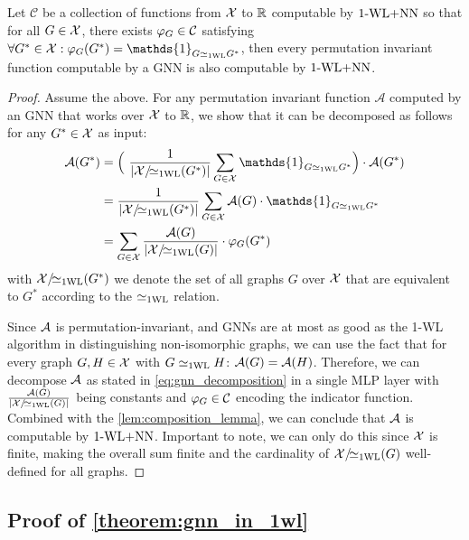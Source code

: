 \begin{lemma}\label{lem:decompose_gnn_as_wl}
    Let $\mathcal{C}$ be a collection of functions from $\mathcal{X}$ to $\mathbb{R}$ computable by $\text{1-WL+NN}$ so that for all $G \in \mathcal{X}$, there exists 
    $\varphi_G \in \mathcal{C}$ satisfying $\forall G^* \in \cX: \varphi_G(G^*) = \mathds{1}_{G \wliso G^*}$, then every permutation invariant function computable by a GNN is also computable by $\text{1-WL+NN}$.
\end{lemma}

\begin{proof}
    Assume the above. For any permutation invariant function $\mathcal{A}$ computed by an GNN that works over $\mathcal{X}$ to $\mathbb{R}$, we show that it can be decomposed as follows for any $G^* \in \mathcal{X}$ as input:
    \begin{align}\label{eq:gnn_decomposition}
        \mathcal{A}(G^*) &= \Bigl( \ \frac{1}{|\cX/\!{\wliso}(G^*)|}\sum_{G \in \cX} \mathds{1}_{G \wliso G^*} \Bigr) \cdot \mathcal{A}(G^*) \nonumber \\
        &= \frac{1}{|\cX/\!{\wliso}(G^*)|}\sum_{G \in \cX} \mathcal{A}(G) \cdot \mathds{1}_{G \wliso G^*} \nonumber \\
        &= \sum_{G \in \cX} \frac{\mathcal{A}(G)}{|\cX/\!{\wliso}(G)|}  \cdot \varphi_G(G^*)
    \end{align}
    with $\mathcal{X}/\!{\simeq_{\text{1WL}}}(G^*)$ we denote the set of all graphs $G$ over $\mathcal{X}$ that are equivalent to $G^*$ according to the $\simeq_{\text{1WL}}$ relation.

    Since $\mathcal{A}$ is permutation-invariant, and GNNs are at most as good as the 1-WL algorithm in distinguishing non-isomorphic graphs, we can use the fact that for every graph $G,H \in \mathcal{X}$ with $G \simeq_{\text{1WL}} H$: $\mathcal{A}(G) = \mathcal{A}(H)$. Therefore, we can decompose $\mathcal{A}$ as stated in \autoref{eq:gnn_decomposition} in a single MLP layer with $\frac{\mathcal{A}(G)}{|\mathcal{X}/\!{\simeq_{\text{1WL}}}(G)|}$ being constants and $\varphi_G \in \mathcal{C}$ encoding the indicator function. Combined with the \cref{lem:composition_lemma}, we can conclude that $\mathcal{A}$ is computable by $\text{1-WL+NN}$. Important to note, we can only do this since $\mathcal{X}$ is finite, making the overall sum finite and the cardinality of $\mathcal{X}/\!{\simeq_{\text{1WL}}}(G)$ well-defined for all graphs.
\end{proof}

\subsection{Proof of \cref{theorem:gnn_in_1wl}}


